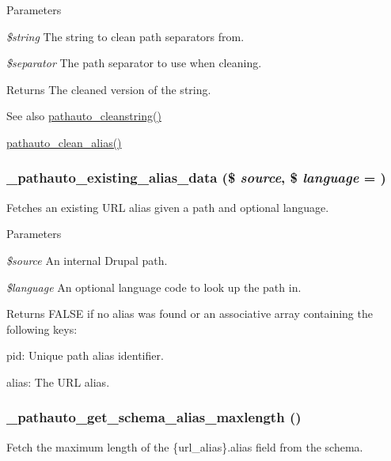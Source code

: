 \begin{DoxyParams}{Parameters}
\item[{\em \$string}]The string to clean path separators from. \item[{\em \$separator}]The path separator to use when cleaning. \end{DoxyParams}
\begin{DoxyReturn}{Returns}
The cleaned version of the string.
\end{DoxyReturn}
\begin{DoxySeeAlso}{See also}
\hyperlink{pathauto_8inc_a0087774598dbc1a71658867d2275a3d1}{pathauto\_\-cleanstring()} 

\hyperlink{pathauto_8inc_a4a29b9c383bf47bb94f57e1602f847d9}{pathauto\_\-clean\_\-alias()} 
\end{DoxySeeAlso}
\hypertarget{pathauto_8inc_a4b36d2f45da703ece553f0d39f26d2b8}{
\subsubsection[{\_\-pathauto\_\-existing\_\-alias\_\-data}]{\setlength{\rightskip}{0pt plus 5cm}\_\-pathauto\_\-existing\_\-alias\_\-data (\$ {\em source}, \/  \$ {\em language} = {})}}
\label{pathauto_8inc_a4b36d2f45da703ece553f0d39f26d2b8}
Fetches an existing URL alias given a path and optional language.


\begin{DoxyParams}{Parameters}
\item[{\em \$source}]An internal Drupal path. \item[{\em \$language}]An optional language code to look up the path in. \end{DoxyParams}
\begin{DoxyReturn}{Returns}
FALSE if no alias was found or an associative array containing the following keys:
\begin{DoxyItemize}
\item pid: Unique path alias identifier.
\item alias: The URL alias. 
\end{DoxyItemize}
\end{DoxyReturn}
\hypertarget{pathauto_8inc_a9f709612633603049fcbd0c2f9b1ef09}{
\subsubsection[{\_\-pathauto\_\-get\_\-schema\_\-alias\_\-maxlength}]{\setlength{\rightskip}{0pt plus 5cm}\_\-pathauto\_\-get\_\-schema\_\-alias\_\-maxlength ()}}
\label{pathauto_8inc_a9f709612633603049fcbd0c2f9b1ef09}
Fetch the maximum length of the \{url\_\-alias\}.alias field from the schema.

